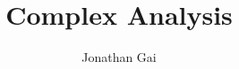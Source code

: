 

\usepackage{bbm}
\usepackage{nicefrac}
\author{Jonathan Gai}
\title{Complex Analysis}


\maketitle
\tableofcontents
{}
